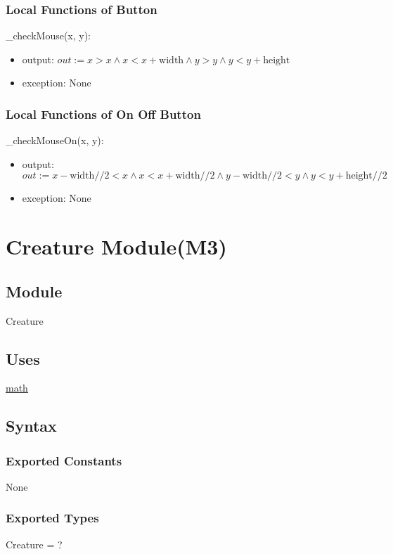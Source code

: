 \documentclass{article}
\begin{document}
\subsubsection{Local Functions of Button}
\noindent \_checkMouse(x, y):
\begin{itemize}
\item output: $out := x > x \land x < x + \text{width} \land y > y \land y < y + \text{height}$
\item exception: None
\end{itemize}\vspace{6mm}

\subsubsection{Local Functions of On Off Button}

\noindent \_checkMouseOn(x, y):
\begin{itemize}
\item output: $out := x - \text{width}//2 < x \land x < x + \text{width}//2 \land y - \text{width}//2 < y \land y < y + \text{height}//2$
\item exception: None
\end{itemize}\vspace{6mm}
\newpage


\section {Creature Module(M3)}

\subsection{Module}
Creature

\subsection {Uses}
\href{https://docs.python.org/3/library/math.html}{math}

\subsection {Syntax}

\subsubsection {Exported Constants}
None

\subsubsection {Exported Types}
Creature = ?
\end{document}
